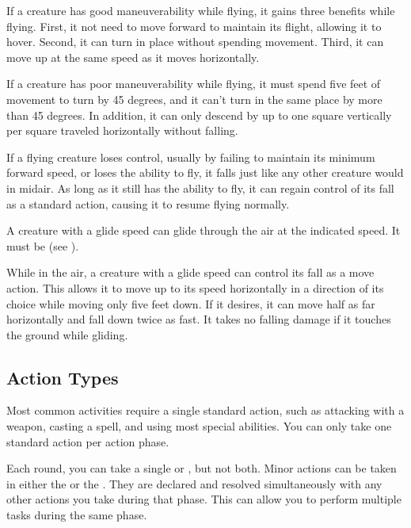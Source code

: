              If a creature has good maneuverability while flying, it gains three benefits while flying.
            First, it not need to move forward to maintain its flight, allowing it to hover.
            Second, it can turn in place without spending movement.
            Third, it can move up at the same speed as it moves horizontally.

             If a creature has poor maneuverability while flying, it must spend five feet of movement to turn by 45 degrees, and it can't turn in the same place by more than 45 degrees. In addition, it can only descend by up to one square vertically per square traveled horizontally without falling.

             If a flying creature loses control, usually by failing to maintain its minimum forward speed, or loses the ability to fly, it falls just like any other creature would in midair. As long as it still has the ability to fly, it can regain control of its fall as a standard action, causing it to resume flying normally.

            \label{Gliding}
            A creature with a glide speed can glide through the air at the indicated speed. It must be  (see ).

            While in the air, a creature with a glide speed can control its fall as a move action. This allows it to move up to its speed horizontally in a direction of its choice while moving only five feet down. If it desires, it can move half as far horizontally and fall down twice as fast. It takes no falling damage if it touches the ground while gliding.

    \subsection{Action Types}

         Most common activities require a single standard action, such as attacking with a weapon, casting a spell, and using most special abilities.
        You can only take one standard action per action phase.

        \label{Minor and Immediate Actions} Each round, you can take a single  or , but not both.
        Minor actions can be taken in either the  or the .
        They are declared and resolved simultaneously with any other actions you take during that phase.
        This can allow you to perform multiple tasks during the same phase.

